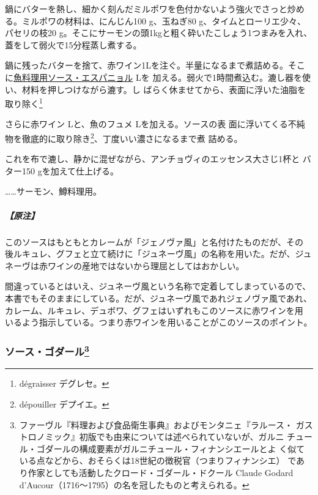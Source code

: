 鍋にバターを熱し、細かく刻んだミルポワを色付かないよう強火でさっと炒め
る。ミルポワの材料は、にんじん100 g、玉ねぎ80 g、タイムとローリエ少々、
パセリの枝20 g。そこにサーモンの頭1kgと粗く砕いたこしょう1つまみを入れ、
蓋をして弱火で15分程蒸し煮する。

鍋に残ったバターを捨て、赤ワイン1Lを注ぐ。半量になるまで煮詰める。そこ
に\protect\hyperlink{sauce-espagnole-maigre}{魚料理用ソース・エスパニョル}\undemi{}
Lを
加える。弱火で1時間煮込む。漉し器を使い、材料を押しつけながら漉す。し
ばらく休ませてから、表面に浮いた油脂を取り除く\footnote{dégraisser
  デグレセ。}

さらに赤ワイン\undemi{} Lと、魚のフュメ\undemi{} Lを加える。ソースの表
面に浮いてくる不純物を徹底的に取り除き\footnote{dépouiller デプイエ。}、丁度いい濃さになるまで煮
詰める。

これを布で漉し、静かに混ぜながら、アンチョヴィのエッセンス大さじ1杯と
バター150 gを加えて仕上げる。

\ldots{}\ldots{}サーモン、鱒料理用。

\hypertarget{ux539fux6ce8-3}{%
\subparagraph{【原注】}\label{ux539fux6ce8-3}}

このソースはもともとカレームが「ジェノヴァ風」と名付けたものだが、その
後ルキュレ、グフェと立て続けに「ジュネーヴ風」の名称を用いた。だが、ジュ
ネーヴは赤ワインの産地ではないから理屈としてはおかしい。

間違っているとはいえ、ジュネーヴ風という名称で定着してしまっているので、
本書でもそのままにしている。だが、ジュネーヴ風であれジェノヴァ風であれ、
カレーム、ルキュレ、デュボワ、グフェはいずれもこのソースに赤ワインを用
いるよう指示している。つまり赤ワインを用いることがこのソースのポイント。

\maeaki

\hypertarget{ux30bdux30fcux30b9ux30b4ux30c0ux30fcux30eb37}{%
\subsubsection[ソース・ゴダール]{\texorpdfstring{ソース・ゴダール\footnote{ファーヴル『料理および食品衛生事典』およびモンタニェ『ラルース・
  ガストロノミック』初版でも由来については述べられていないが、ガルニ
  チュール・ゴダールの構成要素がガルニチュール・フィナンシエールとよ
  く似ている点などから、おそらくは18世紀の徴税官（つまりフィナンシエ）
  であり作家としても活動したクロード・ゴダール・ドクール Claude Godard
  d'Aucour（1716〜1795）の名を冠したものと考えられる。}}{ソース・ゴダール}}\label{ux30bdux30fcux30b9ux30b4ux30c0ux30fcux30eb37}}

